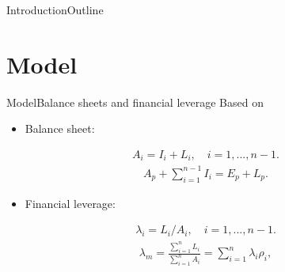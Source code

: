 \documentclass{beamer}
\begin{document}
\begin{frame}{Introduction}{Outline}
  \tableofcontents
\end{frame}
\section{Model}
\begin{frame}{Model}{Balance sheets and financial leverage}
Based on \cite*{huizinga2008capital}
\begin{itemize}
	\item  Balance sheet:
\end{itemize}
\begin{equation}
\begin{aligned}
A_i=I_i+L_i, \quad i=1,...,n-1.
\end{aligned}
\label{eq:sub balance sheet}
\end{equation}
\begin{equation}
\begin{aligned}
A_p+\sum_{i=1}^{n-1}I_i=E_p+L_p. 
\end{aligned}
\label{eq:parent balance sheet}
\end{equation}
\begin{itemize}
	\item  Financial leverage:
\end{itemize}
\begin{equation*}
\begin{aligned}
\lambda_i=L_i/A_i, \quad i=1,...,n-1.
\end{aligned}
\label{eq:sub leverage}
\end{equation*}
\begin{equation}
\begin{aligned}
\lambda_m=\frac{\sum_{i=1}^{n}L_i}{\sum_{i=1}^{n}A_i}=\sum_{i=1}^{n}\lambda_i\rho_i, 
\end{aligned}
\label{eq:total leverage}
\end{equation} 
\end{frame}
\end{document}
